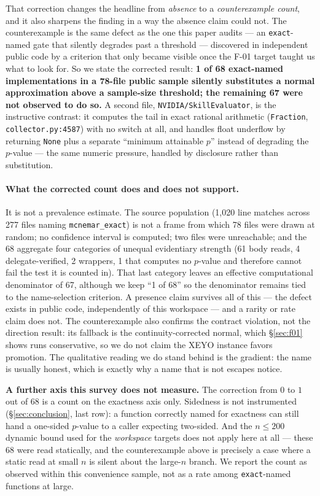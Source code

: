 \documentclass[10pt]{article}
\newcommand{\code}[1]{\texttt{#1}}
\begin{document}
That correction changes the headline from \emph{absence} to a
\emph{counterexample count}, and it also sharpens the finding in a way the
absence claim could not. The
counterexample is the same defect as the one this paper audits --- an
\code{exact}-named gate that silently degrades past a threshold ---
discovered in independent public code by a criterion that only became visible
once the F-01 target taught us what to look for. So we state the corrected
result: \textbf{1 of 68 exact-named implementations in a 78-file public
sample silently substitutes a normal approximation above a sample-size
threshold; the remaining 67 were not observed to do so.} A second file,
\code{NVIDIA/SkillEvaluator}, is the instructive contrast: it computes the
tail in exact rational arithmetic (\code{Fraction}, \code{collector.py:4587})
with no switch at all, and handles float underflow by returning \code{None}
plus a separate ``minimum attainable $p$'' instead of degrading the
$p$-value --- the same numeric pressure, handled by disclosure rather than
substitution.

\paragraph{What the corrected count does and does not support.} It is not a
prevalence estimate. The source population (1{,}020 line matches across 277
files naming \code{mcnemar\_exact}) is not a frame from which 78 files were
drawn at random; no confidence interval is computed; two files were
unreachable; and the 68 aggregate four categories of unequal evidentiary
strength (61 body reads, 4 delegate-verified, 2 wrappers, 1 that computes no
$p$-value and therefore cannot fail the test it is counted in). That last
category leaves an effective computational denominator of 67, although we keep
``1 of 68'' so the denominator remains tied to the name-selection criterion.
A presence claim survives all of this --- the defect exists in public code,
independently of this workspace --- and a rarity or rate claim does not. The
counterexample also confirms the contract violation, not the direction result:
its fallback is the continuity-corrected normal, which \S\ref{sec:f01} shows
runs conservative, so we do not claim the XEYO instance favors promotion. The
qualitative reading we do stand behind is the gradient: the name is usually
honest, which is exactly why a name that is not escapes notice.

\noindent\textbf{A further axis this survey does not measure.} The correction
from $0$ to $1$ out of 68 is a count on the exactness axis only. Sidedness is
not instrumented
(\S\ref{sec:conclusion}, last row): a function correctly named for exactness
can still hand a one-sided $p$-value to a caller expecting two-sided. And the
$n\le200$ dynamic bound used for the \emph{workspace} targets does not apply
here at all --- these 68 were read statically, and the counterexample above
is precisely a case where a static read at small $n$ is silent about the
large-$n$ branch. We report the count as observed within this convenience
sample, not as a rate among \code{exact}-named functions at large.
\end{document}
